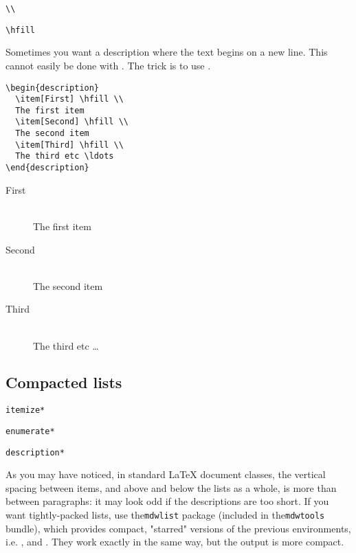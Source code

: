  \begin{lstlisting}
\\
\end{lstlisting}
  \begin{lstlisting}
\hfill
\end{lstlisting}

 Sometimes you want a description where the text begins on a new line. This
cannot easily be done with . The trick is to use . 
\begin{lstlisting}
\begin{description}
  \item[First] \hfill \\
  The first item
  \item[Second] \hfill \\
  The second item
  \item[Third] \hfill \\
  The third etc \ldots
\end{description}
\end{lstlisting}
\begin{description}
  \item[First] \hfill \\
  The first item
  \item[Second] \hfill \\
  The second item
  \item[Third] \hfill \\
  The third etc \ldots
\end{description}

\subsection{Compacted lists}
\begin{lstlisting}
itemize*
\end{lstlisting}
\begin{lstlisting}
enumerate*
\end{lstlisting}
\begin{lstlisting}
description*
\end{lstlisting}

As you may have noticed, in standard LaTeX document classes, the vertical
spacing between items, and above and below the lists as a whole, is more than
between paragraphs: it may look odd if the descriptions are too short. If you
want tightly-packed lists, use the\texttt{mdwlist} package (included in
the\texttt{mdwtools} bundle), which provides compact, "starred" versions of the
previous environments, i.e. ,  and . They work exactly in the same way, but the
output is more compact.

